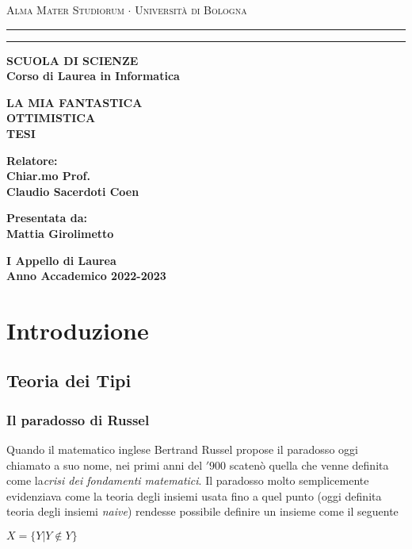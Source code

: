 \documentclass[12pt,a4paper]{report}
\begin{document}
\begin{titlepage}
  \begin{center}
    {{
      \Large{\textsc{Alma Mater Studiorum $\cdot$ Universit\`a di Bologna}}
    }} \rule[0.1cm]{15.8cm}{0.1mm}
    \rule[0.5cm]{15.8cm}{0.6mm}
    {\small{\bf SCUOLA DI SCIENZE\\
    Corso di Laurea in Informatica}}
  \end{center}
  \vspace{15mm}
  \begin{center}
    {\LARGE{\bf LA MIA FANTASTICA}}\\
    \vspace{3mm}
    {\LARGE{\bf OTTIMISTICA}}\\
    \vspace{3mm}
    {\LARGE{\bf TESI}}\\
  \end{center}
  \vspace{40mm}
  \par
  \noindent
  \begin{minipage}[t]{0.47\textwidth}
  {\large{\bf Relatore:\\
  Chiar.mo Prof.\\ %
  Claudio Sacerdoti Coen}}
  \end{minipage}
  \hfill
  \begin{minipage}[t]{0.47\textwidth}\raggedleft
  {\large{\bf Presentata da:\\
  Mattia Girolimetto}}
  \end{minipage}
  \vspace{20mm}
  \begin{center}
  {\large{\bf I Appello di Laurea\\%
  Anno Accademico 2022-2023}}%
  \end{center}
\end{titlepage}


\tableofcontents

\chapter{Introduzione}

\section{Teoria dei Tipi}
\subsection{Il paradosso di Russel}
Quando il matematico inglese Bertrand Russel propose il paradosso oggi chiamato a suo 
nome, nei primi anni del $'900$ scatenò quella che venne definita come la\textit{crisi
dei fondamenti matematici}. Il paradosso molto semplicemente evidenziava come la teoria
degli insiemi usata fino a quel punto (oggi definita teoria degli insiemi \textit{naive})
rendesse possibile definire un insieme come il seguente
\begin{center}
  $X = \{Y | Y \notin Y \}$
\end{center}
\end{document}
